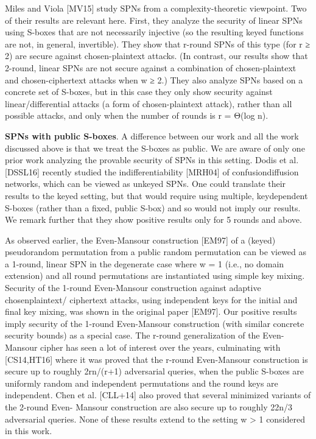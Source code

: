 Miles and Viola [MV15] study SPNs from a complexity-theoretic viewpoint.
Two of their results are relevant here. First, they analyze the security of linear
SPNs using S-boxes that are not necessarily injective (so the resulting keyed
functions are not, in general, invertible). They show that r-round SPNs of this
type (for r ≥ 2) are secure against chosen-plaintext attacks. (In contrast, our
results show that 2-round, linear SPNs are not secure against a combination of
chosen-plaintext and chosen-ciphertext attacks when w ≥ 2.) They also analyze
SPNs based on a concrete set of S-boxes, but in this case they only show security
against linear/differential attacks (a form of chosen-plaintext attack), rather
than all possible attacks, and only when the number of rounds is r = Θ(log n).


{\bf SPNs with public S-boxes}. A difference between our work and all the work
discussed above is that we treat the S-boxes as public. We are aware of only
one prior work analyzing the provable security of SPNs in this setting. Dodis
et al. [DSSL16] recently studied the indifferentiability [MRH04] of confusiondiffusion
networks, which can be viewed as unkeyed SPNs. One could translate
their results to the keyed setting, but that would require using multiple, keydependent
S-boxes (rather than a fixed, public S-box) and so would not imply
our results. We remark further that they show positive results only for 5 rounds
and above.


As observed earlier, the Even-Mansour construction [EM97] of a (keyed)
pseudorandom permutation from a public random permutation can be viewed
as a 1-round, linear SPN in the degenerate case where w = 1 (i.e., no domain
extension) and all round permutations are instantiated using simple key mixing.
Security of the 1-round Even-Mansour construction against adaptive chosenplaintext/
ciphertext attacks, using independent keys for the initial and final key mixing, was shown in the original paper [EM97]. Our positive results imply
security of the 1-round Even-Mansour construction (with similar concrete security
bounds) as a special case. The r-round generalization of the Even-Mansour
cipher has seen a lot of interest over the years, culminating with [CS14,HT16]
where it was proved that the r-round Even-Mansour construction is secure up to
roughly 2rn/(r+1) adversarial queries, when the public S-boxes are uniformly random
and independent permutations and the round keys are independent. Chen et
al. [CLL+14] also proved that several minimized variants of the 2-round Even-
Mansour construction are also secure up to roughly 22n/3 adversarial queries.
None of these results extend to the setting w > 1 considered in this work.





